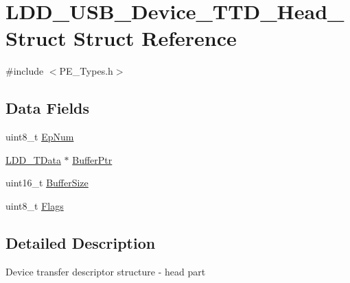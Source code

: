 \hypertarget{struct_l_d_d___u_s_b___device___t_t_d___head___struct}{\section{L\-D\-D\-\_\-\-U\-S\-B\-\_\-\-Device\-\_\-\-T\-T\-D\-\_\-\-Head\-\_\-\-Struct Struct Reference}
\label{struct_l_d_d___u_s_b___device___t_t_d___head___struct}
}


{\ttfamily \#include $<$P\-E\-\_\-\-Types.\-h$>$}

\subsection*{Data Fields}
\begin{DoxyCompactItemize}
\item 
uint8\-\_\-t \hyperlink{struct_l_d_d___u_s_b___device___t_t_d___head___struct_ab3874883985b845f4e4be39240793543}{Ep\-Num}
\item 
\hyperlink{group___p_e___types__module_gade8ef9401405bd941b6da738b807f980}{L\-D\-D\-\_\-\-T\-Data} $\ast$ \hyperlink{struct_l_d_d___u_s_b___device___t_t_d___head___struct_aa1830a973aab07b39899cf4435b8aa26}{Buffer\-Ptr}
\item 
uint16\-\_\-t \hyperlink{struct_l_d_d___u_s_b___device___t_t_d___head___struct_ad04ab3cfb7cab97abbba9dfc3c43f1a0}{Buffer\-Size}
\item 
uint8\-\_\-t \hyperlink{struct_l_d_d___u_s_b___device___t_t_d___head___struct_a9572bb866ff1f22ed881f3ff618c0445}{Flags}
\end{DoxyCompactItemize}


\subsection{Detailed Description}
Device transfer descriptor structure -\/ head part 

